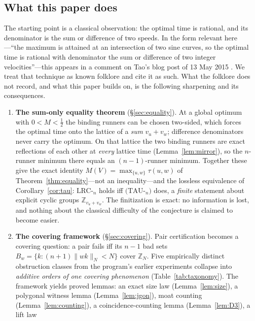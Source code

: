\documentclass[11pt,a4paper]{article}
\numberwithin{equation}{section}
\theoremstyle{plain}
\theoremstyle{plain}
\theoremstyle{definition}
\theoremstyle{remark}
\newcommand{\Z}{\mathbb{Z}}
\newcommand{\wn}[1]{\lVert #1 \rVert_{N}}
\begin{document}
\subsection{What this paper does}

The starting point is a classical observation: the optimal time is rational,
and its denominator is the sum or difference of two speeds. In the form
relevant here---``the maximum is attained at an intersection of two sine
curves, so the optimal time is rational with denominator the sum or
difference of two integer velocities''---this appears in a comment on Tao's
blog post of 13 May 2015 \cite{Tao-blog}. We treat that technique as known
folklore and cite it as such. What the folklore does not record, and what
this paper builds on, is the following sharpening and its consequences.

\begin{enumerate}[leftmargin=1.6em,itemsep=2pt]
\item \textbf{The sum-only equality theorem}
  (\S\ref{sec:equality}). At a global optimum with $0<M<\tfrac12$ the
  binding runners can be chosen two-sided, which forces the optimal time
  onto the lattice of a \emph{sum} $v_u+v_w$; difference denominators never
  carry the optimum. On that lattice the two binding runners are exact
  reflections of each other at \emph{every} lattice time
  (Lemma~\ref{lem:mirror}), so the $n$-runner minimum there equals an
  $(n{-}1)$-runner minimum. Together these give the exact identity
  $M(V)=\max_{\{u,w\}}\tau(u,w)$ of Theorem~\ref{thm:equality}---not an
  inequality---and the lossless equivalence of
  Corollary~\ref{cor:tau}: $\mathrm{LRC}$-$_n$ holds iff
  $(\mathrm{TAU}$-$_n)$ does, a \emph{finite} statement about explicit
  cyclic groups $\Z_{v_u+v_w}$. The finitization is exact: no information
  is lost, and nothing about the classical difficulty of the conjecture is
  claimed to become easier.
\item \textbf{The covering framework} (\S\ref{sec:covering}). Pair
  certification becomes a covering question: a pair fails iff its $n-1$ bad
  sets $B_w=\{k : (n{+}1)\wn{wk}<N\}$ cover $\Z_N$. Five empirically
  distinct obstruction classes from the program's earlier experiments
  collapse into \emph{additive orders of one covering phenomenon}
  (Table~\ref{tab:taxonomy}). The framework yields proved lemmas: an exact
  size law (Lemma~\ref{lem:size}), a polygonal witness lemma
  (Lemma~\ref{lem:jgon}), moat counting (Lemma~\ref{lem:counting}), a
  coincidence-counting lemma (Lemma~\ref{lem:D3}), a lift law

\end{enumerate}
\end{document}
